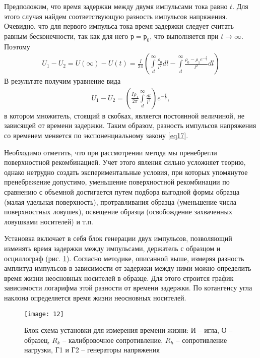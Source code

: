 \documentclass[a4paper,12pt]{article}
\let\tempint\int
\renewcommand{\int}{\tempint\limits}
\begin{document}
Предположим, что время задержки между двумя импульсами тока равно $t$. Для этого случая найдем соответствующую разность импульсов напряжения. Очевидно, что для первого импульса тока время задержки следует считать равным бесконечности, так как для него $р = р_0$, что выполняется при $t\to\infty$. Поэтому
\begin{gather}
	\label{eq21}
	U_{1}-U_{2}=U(\infty)-U(t)=\frac{I}{2 \pi}\left(\int_{d}^{\infty} \frac{\rho_{0}}{l^{2}} d l-\int_{d}^{\infty} \frac{\rho_{0}-\rho_{1} e^{-\frac{t}{\tau}}}{l^{2}} d l\right)
\end{gather}
В результате получим уравнение вида
\begin{gather}
 	\label{eq22}
 	U_{1}-U_{2}=\left(\frac{I \rho_{1}}{2 \pi} \int_{d}^{\infty} \frac{d l}{l^{2}}\right) e^{-\frac{t}{\tau}},
 \end{gather}
 в котором множитель, стоящий в скобках, является постоянной величиной, не зависящей от времени задержки. Таким образом, разность импульсов напряжения со временем меняется по экспоненциальному закону \eqref{eq17}.

Необходимо отметить, что при рассмотрении метода мы пренебрегли поверхностной рекомбинацией. Учет этого явления сильно усложняет теорию, однако нетрудно создать экспериментальные условия, при которых упомянутое пренебрежение допустимо, уменьшение поверхностной рекомбинации по сравнению с объемной достигается путем подбора выгодной формы образца (малая удельная поверхность), протравливания образца (уменьшение числа поверхностных ловушек), освещение образца (освобождение захваченных ловушками носителей) и т.п.

Установка включает в себя блок генерации двух импульсов, позволяющий изменять время задержки между импульсами, держатель с образцом и осциллограф (рис.  \ref{fig:figure11}). Согласно методике, описанной выше, измеряя разность амплитуд импульсов в зависимости от задержки между ними можно определить время жизни неосновных носителей в образце. Для этого строится график зависимости логарифма этой разности от времени задержки. По котангенсу угла наклона определяется время жизни неосновных носителей.
\begin{figure}[H]
	\centering
	\texttt{[image: 12]}
	\caption{Блок схема установки для измерения времени жизни:
И -- игла, О -- образец, $R_k$ -- калибровочное сопротивление, $R_h$ -- сопротивление нагрузки, Г1 и Г2 -- генераторы напряжения }
	\label{fig:figure11}
\end{figure}
\end{document}
